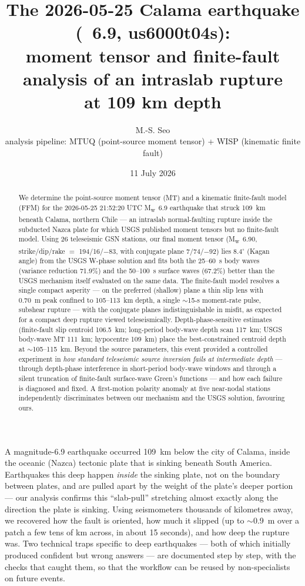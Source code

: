\documentclass[11pt]{article}
\title{\textbf{The 2026-05-25 Calama earthquake (\Mw~6.9, us6000t04s):\\
moment tensor and finite-fault analysis of an intraslab rupture\\at 109 km depth}}
\author{M.-S. Seo\\ \small analysis pipeline: MTUQ (point-source moment tensor) + WISP (kinematic finite fault)}
\date{11 July 2026}
\newcommand{\Mw}{M\textsubscript{w}}
\begin{document}
\maketitle

\begin{abstract}
We determine the point-source moment tensor (MT) and a kinematic finite-fault model (FFM) for
the 2026-05-25 21:52:20 UTC \Mw~6.9 earthquake that struck 109~km beneath Calama, northern
Chile --- an intraslab normal-faulting rupture inside the subducted Nazca plate for which USGS
published moment tensors but no finite-fault model. Using 26 teleseismic GSN stations, our
final moment tensor (\Mw~6.90, strike/dip/rake $=$ 194/16/$-$83, with conjugate plane
7/74/$-$92) lies 8.4$^\circ$ (Kagan angle) from the USGS W-phase solution and fits both the
25--60~s body waves (variance reduction 71.9\%) and the 50--100~s surface waves (67.2\%)
better than the USGS mechanism itself evaluated on the same data. The finite-fault model
resolves a single compact asperity --- on the preferred (shallow) plane a thin slip lens
with 0.70~m peak confined to 105--113~km depth, a single
$\sim$15-s moment-rate pulse, subshear rupture --- with the conjugate planes indistinguishable
in misfit, as expected for a compact deep rupture viewed teleseismically. Depth-phase-sensitive
estimates (finite-fault slip centroid 106.5~km; long-period body-wave depth scan 117~km; USGS
body-wave MT 111~km; hypocentre 109~km) place the best-constrained centroid depth at
$\sim$105--115~km. Beyond the source parameters, this event provided a controlled experiment
in \emph{how standard teleseismic source inversion fails at intermediate depth} --- through
depth-phase interference in short-period body-wave windows and through a silent truncation of
finite-fault surface-wave Green's functions --- and how each failure is diagnosed and fixed. A
first-motion polarity anomaly at five near-nodal stations independently discriminates between
our mechanism and the USGS solution, favouring ours.
\end{abstract}

\begin{tcolorbox}[colback=gray!8,colframe=gray!60,title=\textbf{Plain-language summary}]
A magnitude-6.9 earthquake occurred 109~km below the city of Calama, inside the oceanic
(Nazca) tectonic plate that is sinking beneath South America. Earthquakes this deep happen
\emph{inside} the sinking plate, not on the boundary between plates, and are pulled apart by
the weight of the plate's deeper portion --- our analysis confirms this ``slab-pull'' stretching
almost exactly along the direction the plate is sinking. Using seismometers thousands of
kilometres away, we recovered how the fault is oriented, how much it slipped (up to
$\sim$0.9~m over a patch a few tens of km across, in about 15 seconds), and how deep the
rupture was. Two technical traps specific to deep earthquakes --- both of which initially
produced confident but wrong answers --- are documented step by step, with the checks that
caught them, so that the workflow can be reused by non-specialists on future events.
\end{tcolorbox}
\end{document}
